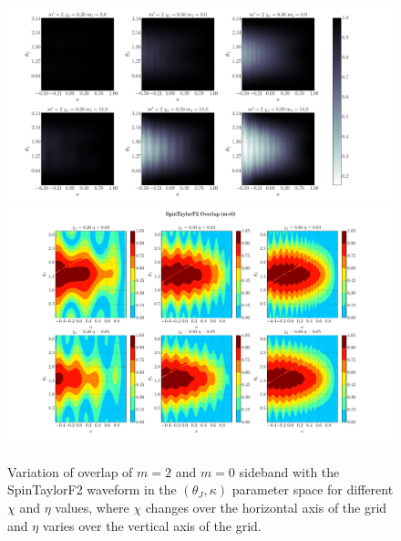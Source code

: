 \label{fig:P2}  \begin{figure}[t]
\includegraphics[width=\textwidth]{./images/OVLP_GRID_P2.pdf}
\includegraphics[width=\textwidth]{./images/OVLP_GRID_P0.pdf} \caption{Variation
of overlap of $m=2$ and $m=0$ sideband with the SpinTaylorF2
waveform in the $(\theta_J, \kappa)$ parameter space for  different $\chi$ and
$\eta$ values, where $\chi$ changes over the horizontal  axis of the grid and
$\eta$ varies over the vertical axis of the grid.}  
\centering  
\end{figure}









